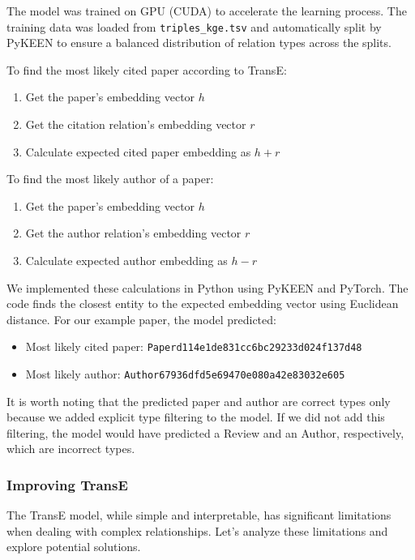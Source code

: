 \documentclass[10pt,a4paper]{article}
\begin{document}
The model was trained on GPU (CUDA) to accelerate the learning process. The training data was loaded from \texttt{triples\_kge.tsv} and automatically split by PyKEEN to ensure a balanced distribution of relation types across the splits.

To find the most likely cited paper according to TransE:
\begin{enumerate}
    \item Get the paper's embedding vector $h$
    \item Get the citation relation's embedding vector $r$
    \item Calculate expected cited paper embedding as $h + r$
\end{enumerate}

To find the most likely author of a paper:
\begin{enumerate}
    \item Get the paper's embedding vector $h$
    \item Get the author relation's embedding vector $r$
    \item Calculate expected author embedding as $h - r$
\end{enumerate}

We implemented these calculations in Python using PyKEEN and PyTorch. The code finds the closest entity to the expected embedding vector using Euclidean distance. For our example paper, the model predicted:
\begin{itemize}
    \item Most likely cited paper: \texttt{Paperd114e1de831cc6bc29233d024f137d48}
    \item Most likely author: \texttt{Author67936dfd5e69470e080a42e83032e605}
\end{itemize}

It is worth noting that the predicted paper and author are correct types only because we added explicit type filtering to the model. If we did not add this filtering, the model would have predicted a Review and an Author, respectively, which are incorrect types.

\subsubsection{Improving TransE}

The TransE model, while simple and interpretable, has significant limitations when dealing with complex relationships. Let's analyze these limitations and explore potential solutions.
\end{document}
